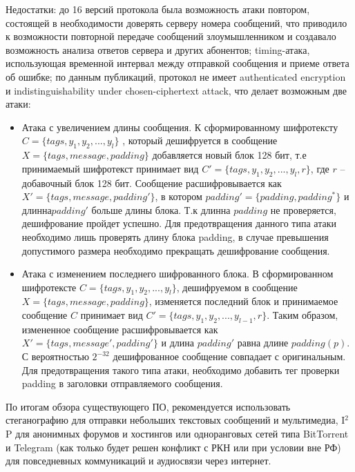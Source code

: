 Недостатки: до 16 версий протокола была  возможность атаки повтором, состоящей в необходимости доверять серверу номера сообщений, что приводило к возможности повторной передаче сообщений злоумышленником и создавало возможность анализа ответов сервера и других абонентов; timing-атака, использующая  временной интервал между отправкой сообщения и приеме ответа об ошибке; по данным публикаций, протокол не имеет authenticated encryption и indistinguishability under chosen-ciphertext attack, что делает возможным две атаки:
\begin{itemize}
	\item Атака с увеличением длины сообщения. К сформированному шифротексту $ C=\{tags, y_{1}, y_{2}, ... , y_{l}\} $ , который дешифруется в сообщение $ X= \{tags,message,padding\} $ добавляется новый блок 128 бит, т.е принимаемый шифротекст принимает вид $ C'=\{tags, y_{1}, y_{2}, ... , y_{l}, r\} $, где $ r $ -- добавочный блок 128 бит. Сообщение расшифровывается как $ X'= \{tags,message,padding'\} $, в котором $  padding' =  \{padding, padding^{*}\}$ и длинна$  padding' $ больше длины блока. Т.к длинна $ padding $ не проверяется, дешифрование пройдет успешно. Для предотвращения данного типа атаки необходимо лишь проверять длину блока padding, в случае превышения допустимого размера необходимо прекращать дешифрование сообщения.
	\item Атака с изменением последнего шифрованного блока. В сформированном шифротексте $ C=\{tags, y_{1}, y_{2}, ... , y_{l}\} $, дешифруемом в сообщение $ X=  \{tags,message,padding\} $, изменяется последний блок и принимаемое сообщение  $ C $ принимает вид $ C'=\{tags, y_{1}, y_{2}, ... , y_{l-1}, r\} $. Таким образом, измененное сообщение расшифровывается как    $ X'= \{tags,message',padding'\} $ и длина $ padding' $ равна длине $ padding(p) $. С вероятностью $ 2^{-32} $ дешифрованное сообщение совпадает с оригинальным. Для предотвращения  такого типа атаки, необходимо добавить тег проверки padding в заголовки отправляемого сообщения. %
	
\end{itemize}


По итогам обзора существующего ПО, рекомендуется использовать стеганографию для отправки небольших текстовых сообщений и мультимедиа, I$ ^{2} $P для анонимных форумов и хостингов  или одноранговых сетей типа BitTorrent и Telegram (как только будет решен конфликт с РКН или при условии вне РФ) для повседневных коммуникаций и аудиосвязи через интернет.

